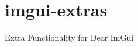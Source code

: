 \chapter{imgui-\/extras}
\hypertarget{md__r_e_a_d_m_e}{}\label{md__r_e_a_d_m_e}
\label{md__r_e_a_d_m_e_autotoc_md0}%
%
Extra Functionality for Dear Im\+Gui 